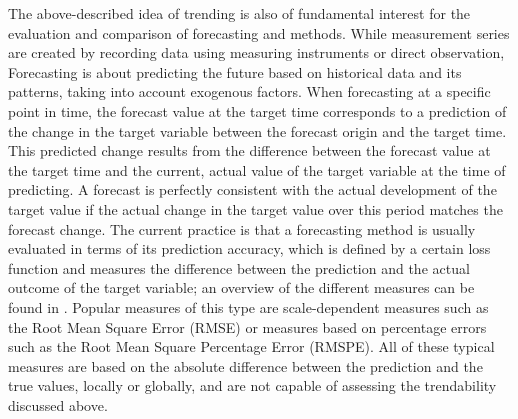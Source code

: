 The above-described idea of trending is also of fundamental interest for the evaluation and comparison of forecasting and methods. 
While measurement series are created by recording data using measuring instruments or direct observation, Forecasting is about predicting the future based on historical data and its patterns, taking into account exogenous factors. 
When forecasting at a specific point in time, the forecast value at the target time corresponds to a prediction of the change in the target variable between the forecast origin and the target time. 
This predicted change results from the difference between the forecast value at the target time and the current, actual value of the target variable at the time of predicting. 
A forecast is perfectly consistent with the actual development of the target value if the actual change in the target value over this period matches the forecast change. 
The current practice is that a forecasting method is usually evaluated in terms of its prediction accuracy, which is defined by a certain loss function and measures the difference between the prediction and the actual outcome of the target variable; an overview of the different measures can be found in \cite{hyndman2006another}. 
Popular measures of this type are scale-dependent measures such as the Root Mean Square Error (RMSE) or measures based on percentage errors such as the Root Mean Square Percentage Error (RMSPE). 
All of these typical measures are based on the absolute difference between the prediction and the true values, locally or globally, and are not capable of assessing the trendability discussed above.

